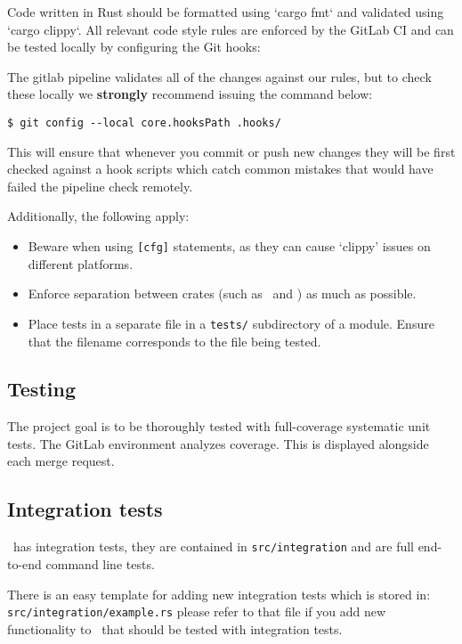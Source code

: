 Code written in Rust should be formatted using `cargo fmt` and validated using `cargo clippy`.
All relevant code style rules are enforced by the GitLab CI and can be tested locally
by configuring the Git hooks:

The gitlab pipeline validates all of the changes against our rules, but to check these locally
we \textbf{strongly} recommend issuing the command below:

\begin{verbatim}
$ git config --local core.hooksPath .hooks/
\end{verbatim}

This will ensure that whenever you commit or push new changes they will be first checked against
a hook scripts which catch common mistakes that would have failed the pipeline check remotely.

Additionally, the following apply:
\begin{itemize}
  \item Beware when using \verb|[cfg]| statements, as they can cause `clippy' issues on different platforms.
  \item Enforce separation between crates (such as \gourd\ and \gourdwrap) as much as possible.
  \item Place tests in a separate file in a \verb|tests/| subdirectory of a module.
        Ensure that the filename corresponds to the file being tested.
\end{itemize}

\subsection{Testing}

The project goal is to be thoroughly tested with full-coverage systematic unit tests.
The GitLab environment analyzes coverage. This is displayed alongside each merge request.

\subsection{Integration tests}

\gourd\ has integration tests, they are contained in \texttt{src/integration} and
are full end-to-end command line tests.

There is an easy template for adding new integration tests which is stored in: \\
\texttt{src/integration/example.rs} please refer to that file if you add
new functionality to \gourd\ that should be tested with integration tests.
